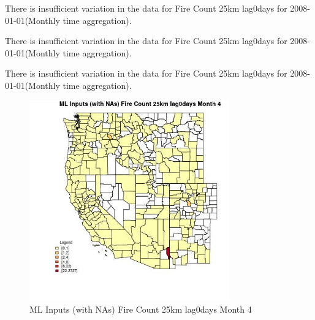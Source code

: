 There is insufficient variation in the data for Fire Count 25km lag0days for 2008-01-01(Monthly time aggregation). 
 

There is insufficient variation in the data for Fire Count 25km lag0days for 2008-01-01(Monthly time aggregation). 
 

There is insufficient variation in the data for Fire Count 25km lag0days for 2008-01-01(Monthly time aggregation). 
 

\begin{figure} 
\centering  
\includegraphics[width=0.77\textwidth]{Code_Outputs/Report_ML_input_PM25_Step4_part_f_de_duplicated_aves_prioritize_24hr_obswNAs_CountyFire_Count_25km_lag0daysmedianMonth4.jpg} 
\caption{\label{fig:Report_ML_input_PM25_Step4_part_f_de_duplicated_aves_prioritize_24hr_obswNAsCountyFire_Count_25km_lag0daysmedianMonth4}ML Inputs (with NAs) Fire Count 25km lag0days Month 4} 
\end{figure} 
 

